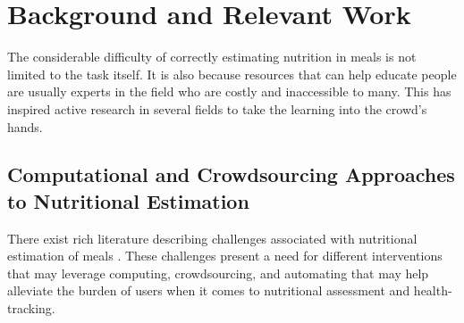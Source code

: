 \section{Background and Relevant Work}
The considerable difficulty of correctly estimating nutrition in meals is not limited to the task itself. It is also because resources that can help educate people are usually experts in the field who are costly and inaccessible to many. This has inspired active research in several fields to take the learning into the crowd's hands. 


\subsection{Computational and Crowdsourcing Approaches to Nutritional Estimation}
There exist rich literature describing challenges associated with nutritional estimation of meals \cite{berkman2011low,chandon2007obesity,chaudhry2016evaluation,chaudry2013formative,stanton2006nutrition,kim2014energy,lansky1982estimates,schwartz2006ability}. 
These challenges present a need for different interventions that may leverage computing, crowdsourcing, and automating that may help alleviate the burden of users when it comes to nutritional assessment and health-tracking. 




